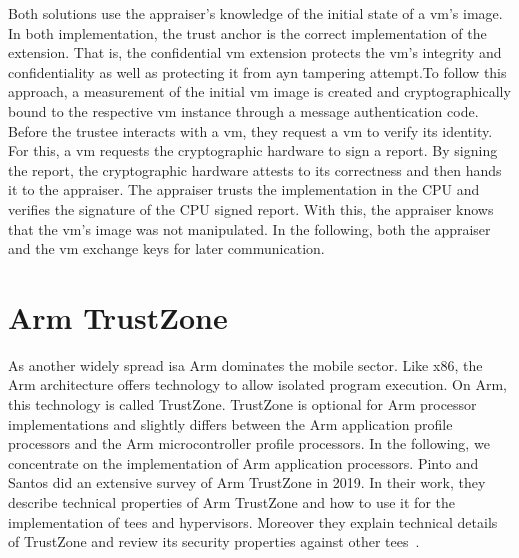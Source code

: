 Both solutions use the appraiser's knowledge of the initial state of a
\gls{vm}'s image. In both implementation, the trust anchor is the correct
implementation of the extension. That is, the confidential \gls{vm} extension
protects the \gls{vm}'s integrity and confidentiality as well as protecting it
from ayn tampering attempt.To follow this approach, a measurement of the initial
\gls{vm} image is created and cryptographically bound to the respective \gls{vm}
instance through a message authentication code. Before the trustee interacts
with a \gls{vm}, they request a \gls{vm} to verify its identity. For this, a
\gls{vm} requests the cryptographic hardware to sign a report. By signing the
report, the cryptographic hardware attests to its correctness and then hands it
to the appraiser. The appraiser trusts the implementation in the CPU and
verifies the signature of the CPU signed report. With this, the appraiser knows
that the \gls{vm}'s image was not manipulated. In the following, both the
appraiser and the \gls{vm} exchange keys for later communication.\\

\section{Arm TrustZone}
\label{sec:20:trustzone}
As another widely spread \gls{isa} Arm dominates the mobile sector. Like x86,
the Arm architecture offers technology to allow isolated program execution. On
Arm, this technology is called TrustZone. TrustZone is optional for Arm
processor implementations and slightly differs between the Arm application
profile processors and the Arm microcontroller profile processors. In the
following, we concentrate on the implementation of Arm application processors.
Pinto and Santos did an extensive survey of Arm TrustZone in 2019. In their
work, they describe technical properties of Arm TrustZone and how to use it for
the implementation of \glspl{tee} and hypervisors. Moreover they explain
technical details of TrustZone and review its security properties against other
\glspl{tee}~\cite{pinto_demystifying_2019}.\\

